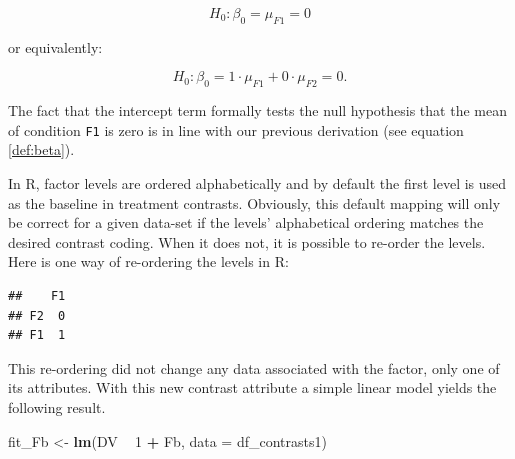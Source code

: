 \documentclass[12pt,]{krantz}
\newenvironment{Shaded}{\begin{snugshade}}{\end{snugshade}}
\newcommand{\DataTypeTok}[1]{\textcolor[rgb]{0.13,0.29,0.53}{#1}}
\newcommand{\DecValTok}[1]{\textcolor[rgb]{0.00,0.00,0.81}{#1}}
\newcommand{\KeywordTok}[1]{\textcolor[rgb]{0.13,0.29,0.53}{\textbf{#1}}}
\newcommand{\NormalTok}[1]{#1}
\newcommand{\OperatorTok}[1]{\textcolor[rgb]{0.81,0.36,0.00}{\textbf{#1}}}
\newcommand{\StringTok}[1]{\textcolor[rgb]{0.31,0.60,0.02}{#1}}
\begin{document}
\begin{equation}
H_0: \beta_0 = \mu_{F1} = 0
\end{equation}

\noindent
or equivalently:

\begin{equation} \label{eq:trmtcontrfirstmention}
H_0: \beta_0 = 1 \cdot \mu_{F1} + 0 \cdot \mu_{F2} = 0 .
\end{equation}

\noindent
The fact that the intercept term formally tests the null hypothesis that the mean of condition \texttt{F1} is zero is in line with our previous derivation (see equation \ref{def:beta}).

In R, factor levels are ordered alphabetically and by default the first level is used as the baseline in treatment contrasts. Obviously, this default mapping will only be correct for a given data-set if the levels' alphabetical ordering matches the desired contrast coding. When it does not, it is possible to re-order the levels. Here is one way of re-ordering the levels in R:

\begin{Shaded}
\end{Shaded}

\begin{verbatim}
##    F1
## F2  0
## F1  1
\end{verbatim}

\noindent
This re-ordering did not change any data associated with the factor, only one of its attributes. With this new contrast attribute a simple linear model yields the following result.

\begin{Shaded}
\begin{Highlighting}[]
\NormalTok{fit_Fb <-}\StringTok{ }\KeywordTok{lm}\NormalTok{(DV }\OperatorTok{~}\StringTok{ }\DecValTok{1} \OperatorTok{+}\StringTok{ }\NormalTok{Fb,}
                 \DataTypeTok{data =}\NormalTok{ df_contrasts1) }
\end{Highlighting}
\end{Shaded}
\end{document}
